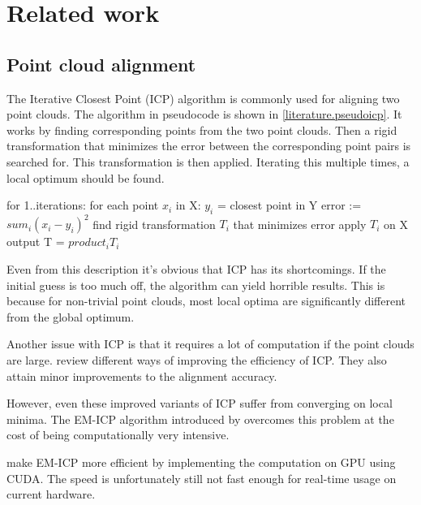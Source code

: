 \chapter{Related work}


\section{Point cloud alignment} \label{literature.alignment}


The Iterative Closest Point (ICP) algorithm is commonly used for aligning two point clouds.  The algorithm in pseudocode is shown in \ref{literature.pseudoicp}. It works by finding corresponding points from the two point clouds. Then a rigid transformation that minimizes the error between the corresponding point pairs is searched for. This transformation is then applied. Iterating this multiple times, a local optimum should be found.

\begin{algorithm}
\label{literature.pseudoicp}
for 1..iterations:
  for each point $x_i$ in X:
    $y_i$ = closest point in Y
  error := $sum_i (x_i-y_i)^2$
  find rigid transformation $T_i$ that minimizes error
  apply $T_i$ on X
output T = $product_i T_i$
\end{algorithm}

Even from this description it's obvious that ICP has its shortcomings. If the initial guess is too much off, the algorithm can yield horrible results. This is because for non-trivial point clouds, most local optima are significantly different from the global optimum.

Another issue with ICP is that it requires a lot of computation if the point clouds are large. \citep{rusinkiewicz2001efficient} review different ways of improving the efficiency of ICP. They also attain minor improvements to the alignment accuracy.

However, even these improved variants of ICP suffer from converging on local minima. The EM-ICP  algorithm introduced by \citep{granger2006multi} overcomes this problem at the cost of being computationally very intensive. 

\citep{tamaki2010softassign} make EM-ICP more efficient by implementing the computation on GPU using CUDA. The speed is unfortunately still not fast enough for real-time usage on current hardware.

